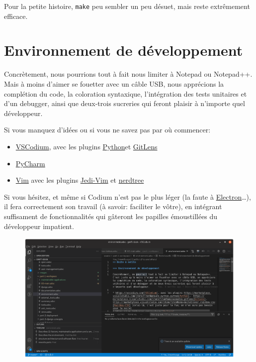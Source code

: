 \documentclass[11pt]{amsbook}
\begin{document}
Pour la petite histoire, \texttt{make} peu sembler un peu désuet, mais reste extrêmement efficace.


\hypertarget{x-environnement-de-développement}{\section{Environnement de développement}}
Concrètement, nous pourrions tout à fait nous limiter à Notepad ou Notepad++.
Mais à moins d’aimer se fouetter avec un câble USB, nous apprécions la complétion du code, la coloration syntaxique, l’intégration des tests unitaires et d’un debugger, ainsi que deux-trois sucreries qui feront plaisir à n’importe quel développeur.


Si vous manquez d’idées ou si vous ne savez pas par où commencer:


\begin{itemize}

\item \href{https://vscodium.com/}{VSCodium}, avec les plugins \href{https://marketplace.visualstudio.com/items?itemName=ms-python.python}{Python}et \href{https://marketplace.visualstudio.com/items?itemName=eamodio.gitlens}{GitLens}

\item \href{https://www.jetbrains.com/pycharm/}{PyCharm}

\item \href{https://www.vim.org/}{Vim} avec les plugins \href{https://github.com/davidhalter/jedi-vim}{Jedi-Vim} et \href{https://github.com/preservim/nerdtree}{nerdtree}

\end{itemize}


Si vous hésitez, et même si Codium n’est pas le plus léger (la faute à \href{https://www.electronjs.org/}{Electron}…​), il fera correctement son travail (à savoir: faciliter le vôtre), en intégrant suffisament de fonctionnalités qui gâteront les papilles émoustillées du développeur impatient.


\begin{figure}[h]{}
\centering\includegraphics[width=2.5truein]{images/environment/codium.png}
\caption{}

\end{figure}
\end{document}
